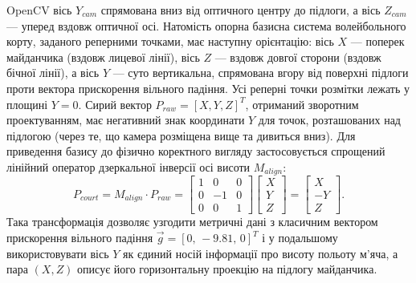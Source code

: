 OpenCV вісь $Y_{cam}$ спрямована вниз від оптичного центру до підлоги,
а вісь $Z_{cam}$ — уперед вздовж оптичної осі. Натомість опорна базисна
система волейбольного корту, заданого реперними точками,
має наступну орієнтацію: вісь $X$ — поперек майданчика
(вздовж лицевої лінії), вісь $Z$ — вздовж довгої сторони
(вздовж бічної лінії), а вісь $Y$ — суто вертикальна, спрямована вгору
від поверхні підлоги проти вектора прискорення вільного падіння. Усі
реперні точки розмітки лежать у площині $Y = 0$. Сирий вектор $P_{raw} =
[X, Y, Z]^T$, отриманий зворотним проектуванням, має негативний знак
координати $Y$ для точок, розташованих над підлогою (через те, що камера
розміщена вище та дивиться вниз). Для приведення базису до фізично
коректного вигляду застосовується спрощений лінійний оператор
дзеркальної інверсії осі висоти $M_{align}$:
\begin{equation}P_{court} = M_{align} \cdot P_{raw} = \begin{bmatrix} 1 & 0 & 0 \\ 0 & -1 & 0 \\ 0 & 0 & 1
\end{bmatrix} \begin{bmatrix} X \\ Y \\ Z \end{bmatrix} = \begin{bmatrix} X \\ -Y \\ Z
\end{bmatrix}.\end{equation}
Така трансформація дозволяє узгодити метричні дані з класичним
вектором прискорення вільного падіння $\vec{g} = [0,\, -9.81,\, 0]^T$ і у
подальшому використовувати вісь $Y$ як єдиний носій інформації про
висоту польоту м'яча, а пара $(X, Z)$ описує його горизонтальну
проекцію на підлогу майданчика.

